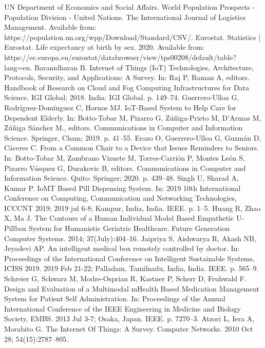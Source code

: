 \documentclass{IOS-Book-Article}
\begin{document}
\begin{thebibliography}{99}

UN Department of Economics and Social Affairs. World Population Prospects - Population Division - United Nations. The International Journal of Logistics Management. Available from: https://population.un.org/wpp/Download/Standard/CSV/.
Eurostat. Statistics | Eurostat. Life expectancy at birth by sex. 2020. Available from: https://ec.europa.eu/eurostat/databrowser/view/tps00208/default/table?lang=en.
Baranidharan B. Internet of Things (IoT) Technologies, Architecture, Protocols, Security, and Applications: A Survey. In: Raj P, Raman A, editors. Handbook of Research on Cloud and Fog Computing Infrastructures for Data Science. IGI Global; 2018. India: IGI Global. p. 149–74.
Guerrero-Ulloa G, Rodríguez-Domínguez C, Hornos MJ. IoT-Based System to Help Care for Dependent Elderly. In: Botto-Tobar M, Pizarro G, Zúñiga-Prieto M, D’Armas M, Zúñiga Sánchez M., editors. Communications in Computer and Information Science. Springer, Cham; 2019. p. 41–55.
Erazo O, Guerrero-Ulloa G, Guzmán D, Cáceres C. From a Common Chair to a Device that Issues Reminders to Seniors. In: Botto-Tobar M, Zambrano Vizuete M, Torres-Carrión P, Montes León S, Pizarro Vásquez G, Durakovic B, editors. Communications in Computer and Information Science. Quito: Springer; 2020. p. 439–48.
Singh U, Sharad A, Kumar P. IoMT Based Pill Dispensing System. In: 2019 10th International Conference on Computing, Communication and Networking Technologies, ICCCNT 2019; 2019 jul 6-8; Kampur, India, India. IEEE. p. 1–5. 
Huang R, Zhao X, Ma J. The Contours of a Human Individual Model Based Empathetic U-Pillbox System for Humanistic Geriatric Healthcare. Future Generation Computer Systems. 2014; 37(July):404–16.
Jaipriya S, Aishwarya R, Akash NB, Jeyadevi AP. An intelligent medical box remotely controlled by doctor. In: Proceedings of the International Conference on Intelligent Sustainable Systems, ICISS 2019. 2019 Feb 21-22; Palladam, Tamilnadu, India, India. IEEE. p. 565–9.
Schreier G, Schwarz M, Modre-Osprian R, Kastner P, Scherr D, Fruhwald F. Design and Evaluation of a Multimodal mHealth Based Medication Management System for Patient Self Administration. In: Proceedings of the Annual International Conference of the IEEE Engineering in Medicine and Biology Society, EMBS. 2013 Jul 3-7; Osaka, Japan. IEEE. p. 7270–3.
Atzori L, Iera A, Morabito G. The Internet Of Things: A Survey. Computer Networks. 2010 Oct 28; 54(15):2787–805.

\end{thebibliography}
\end{document}
